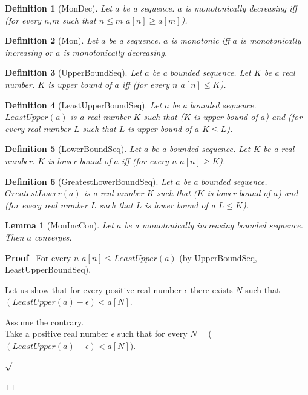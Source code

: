 \documentclass{article}
\newenvironment{forthel}{\begin{leftbar}}{\end{leftbar}}
\newenvironment{proof}{\noindent\textbf{Proof\ }}{\hspace*{\fill}$\Box$\medskip}
\newenvironment{subproof}{\begin{list}{}{}
		\item[\text{Proof}]}{\hfill $\surd$ \end{list}}
\newtheorem{lemma}{Lemma}
\newtheorem{definition}{Definition}
\begin{document}
\begin{forthel}
	\begin{definition}[MonDec]
		Let $a$ be a sequence. $a$ is monotonically decreasing iff (for every $n$,$m$ such that $n \leq m$ $a[n] \geq a[m]$).
	\end{definition}
	
	\begin{definition}[Mon]
		Let $a$ be a sequence. $a$ is monotonic iff $a$ is monotonically increasing or $a$ is monotonically decreasing.
	\end{definition}
	
	\begin{definition}[UpperBoundSeq]
		Let $a$ be a bounded sequence. Let $K$ be a real number. $K$ is upper bound of $a$ iff (for every $n$ $a[n] \leq K$).
	\end{definition}
	
	\begin{definition}[LeastUpperBoundSeq]
		Let $a$ be a bounded sequence. $LeastUpper(a)$ is a real number $K$ such that ($K$ is upper bound of $a$) and 
		(for every real number $L$ such that $L$ is upper bound of $a$ $K \leq L$).
	\end{definition}
	
	\begin{definition}[LowerBoundSeq]
		Let $a$ be a bounded sequence. Let $K$ be a real number. $K$ is lower bound of $a$ iff (for every $n$ $a[n] \geq K$).
	\end{definition}
	
	\begin{definition}[GreatestLowerBoundSeq]
		Let $a$ be a bounded sequence. $GreatestLower(a)$ is a real number $K$ such that ($K$ is lower bound of $a$) and
		(for every real number $L$ such that $L$ is lower bound of a $L \leq K$).
	\end{definition}
	
	\begin{lemma}[MonIncCon]
		Let $a$ be a monotonically increasing bounded sequence. Then $a$ converges.
	\end{lemma}
	
	\begin{proof}
		For every $n$ $a[n] \leq LeastUpper(a)$ (by UpperBoundSeq, LeastUpperBoundSeq).

		\noindent Let us show that for every positive real number $\epsilon$ there exists $N$ such that $(LeastUpper(a) - \epsilon) < a[N]$.
		\begin{subproof}
			Assume the contrary.\\
			Take a positive real number $\epsilon$ such that for every $N$ $\neg$ ($(LeastUpper(a) - \epsilon) < a[N]$).
			

\end{subproof}
\end{proof}
\end{forthel}
\end{document}
